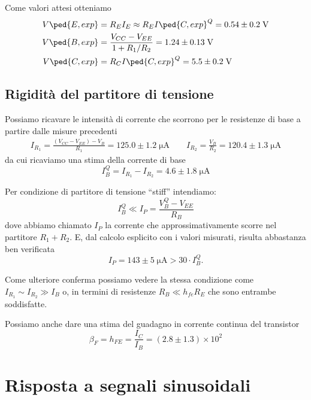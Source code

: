 \documentclass[10pt,a4paper]{article}
\begin{document}
\iffalse
mentre rispetto a $GND$:
\begin{align*}
V_E &= -773 \pm 4 \; \si{m\V} \\
V_B &= -3.76 \pm 0.03 \; \si{\V} \\
V_C &= -4.39 \pm 0.03 \; \si{V} \\
\end{align*}
\fi

Come valori attesi otteniamo
\begin{align*}
V\ped{E, exp} &= R_E I_E \approx R_E I\ped{C, exp}^Q = 0.54 \pm 0.2 \; \si{\V} \\
V\ped{B, exp} &= \frac{V_{CC} - V_{EE}}{1 + R_1/R_2} = 1.24 \pm 0.13 \; \si{\V}
\\
V\ped{C, exp} &= R_C I\ped{C, exp}^Q = 5.5 \pm 0.2 \; \si{V} \\
\end{align*}
\subsection{Rigidità del partitore di tensione}
Possiamo ricavare le intensità di corrente che scorrono per le resistenze
di base a partire dalle misure precedenti
\begin{align*}
I_{R_1} = \frac{(V_{CC} - V_{EE}) - V_B}{R_1} = 125.0 \pm 1.2 \; \si{\micro\A} \qquad
I_{R_2} = \frac{V_B}{R_2} = 120.4 \pm 1.3 \; \si{\micro\A} 
\end{align*}
da cui ricaviamo una stima della corrente di base
\[
I_B^Q = I_{R_1} - I_{R_2} =  4.6 \pm 1.8 \; \si{\micro\A}
\]

Per condizione di partitore di tensione ``stiff'' intendiamo:
\begin{equation}
I_B^Q \ll I_P = \frac{V_B^Q - V_{EE}}{R_B}
\end{equation}
dove abbiamo chiamato $I_P$ la corrente che approssimativamente scorre nel
partitore $R_1 + R_2$.
E, dal calcolo esplicito con i valori misurati, risulta abbastanza ben
verificata
\[
I_P = 143 \pm 5 \; \si{\micro\A} > 30 \cdot I_B^Q
.\] 

Come ulteriore conferma possiamo vedere la stessa condizione come 
$I_{R_1} \sim I_{R_2} \gg I_{B}$ o, in termini di resistenze
$R_B \ll h_{fe} R_E$ che sono entrambe soddisfatte.

Possiamo anche dare una stima del guadagno in corrente continua del transistor
\[
\beta_F = h_{FE} = \frac{I_C}{I_B} = (2.8 \pm 1.3) \times 10^{2}  
\]

\section{Risposta a segnali sinusoidali}
\end{document}
